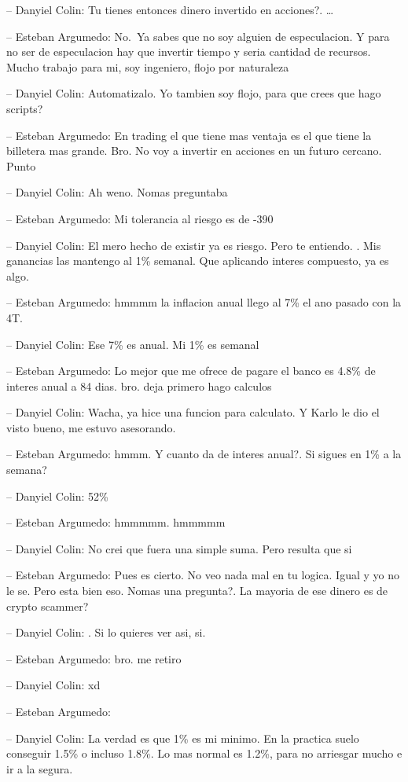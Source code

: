-- Danyiel Colin: Tu tienes entonces dinero invertido en acciones?.
\ldots{}

-- Esteban Argumedo: No.~Ya sabes que no soy alguien de especulacion. Y
para no ser de especulacion hay que invertir tiempo y seria cantidad de
recursos. Mucho trabajo para mi, soy ingeniero, flojo por naturaleza

-- Danyiel Colin: Automatizalo. Yo tambien soy flojo, para que crees que
hago scripts?

-- Esteban Argumedo: En trading el que tiene mas ventaja es el que tiene
la billetera mas grande. Bro. No voy a invertir en acciones en un futuro
cercano. Punto

-- Danyiel Colin: Ah weno. Nomas preguntaba

-- Esteban Argumedo: Mi tolerancia al riesgo es de -390

-- Danyiel Colin: El mero hecho de existir ya es riesgo. Pero te
entiendo. . Mis ganancias las mantengo al 1\% semanal. Que aplicando
interes compuesto, ya es algo.

-- Esteban Argumedo: hmmmm la inflacion anual llego al 7\% el ano pasado
con la 4T.

-- Danyiel Colin: Ese 7\% es anual. Mi 1\% es semanal

-- Esteban Argumedo: Lo mejor que me ofrece de pagare el banco es 4.8\%
de interes anual a 84 dias. bro. deja primero hago calculos

-- Danyiel Colin: Wacha, ya hice una funcion para calculato. Y Karlo le
dio el visto bueno, me estuvo asesorando.

-- Esteban Argumedo: hmmm. Y cuanto da de interes anual?. Si sigues en
1\% a la semana?

-- Danyiel Colin: 52\%

-- Esteban Argumedo: hmmmmm. hmmmmm

-- Danyiel Colin: No crei que fuera una simple suma. Pero resulta que si

-- Esteban Argumedo: Pues es cierto. No veo nada mal en tu logica. Igual
y yo no le se. Pero esta bien eso. Nomas una pregunta?. La mayoria de
ese dinero es de crypto scammer?

-- Danyiel Colin: . Si lo quieres ver asi, si.

-- Esteban Argumedo: bro. me retiro

-- Danyiel Colin: xd

-- Esteban Argumedo:

-- Danyiel Colin: La verdad es que 1\% es mi minimo. En la practica
suelo conseguir 1.5\% o incluso 1.8\%. Lo mas normal es 1.2\%, para no
arriesgar mucho e ir a la segura.

